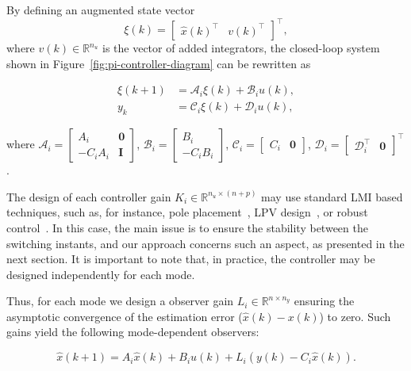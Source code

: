 By defining an augmented state vector
\[
  \xi(k)=\begin{bmatrix}{\hat{x}(k)}^\top &v{(k)}^\top\end{bmatrix}^\top,
\]
where \(v(k)\in\mathbb{R}^{n_u}\) is the vector of added integrators, the
closed-loop system shown in Figure~\ref{fig:pi-controller-diagram} can be
rewritten as

\begin{equation}
  \label{sistemaaum}
  \begin{split}
    \xi(k+1) &= \mathcal{A}_i\xi(k)+\mathcal{B}_{i}u(k), \\
    y_{k}    &= \mathcal{C}_i\xi(k)+\mathcal{D}_{i}u(k),
  \end{split}
\end{equation}

where \(\mathcal{A}_i=\begin{bmatrix}A_i & \textbf{0} \\-C_{i}A_i&\textbf{I}
\end{bmatrix} \), \(\mathcal{B}_i=\begin{bmatrix}B_i\\-C_{i}B_i\end{bmatrix}\),
\(\mathcal{C}_i=\begin{bmatrix} C_i & \textbf{0} \end{bmatrix}\),
\(\mathcal{D}_i=\begin{bmatrix}\mathcal{D}_i^\top&\textbf{0}\end{bmatrix}^\top\).

The design of each controller gain \(K_i\in\mathbb{R}^{n_u\times{}(n+p)}\) may use
standard LMI based techniques, such as, for instance, pole
placement~\parencite{yu:lmis}, LPV design~\parencite{briat:linear}, or robust
control~\parencite{boyd.ghaoui.ea:linear}. In this case, the main issue is to
ensure the stability between the switching instants, and our approach concerns
such an aspect, as presented in the next section. It is important to note that,
in practice, the controller may be designed independently for each mode.

Thus, for each mode we design a observer gain \(L_{i}\in\mathbb{R}^{n\times{}n_y}\)
ensuring the asymptotic convergence of the estimation error
(\(\hat{x}(k)-x(k)\)) to zero. Such gains yield the following mode-dependent
observers:

\begin{equation}
  \label{eq:observer}
  \hat{x}(k+1) = A_{i}\hat{x}(k) + B_{i}u(k) + L_{i}(y(k)-C_{i}\hat{x}(k)).
\end{equation}

